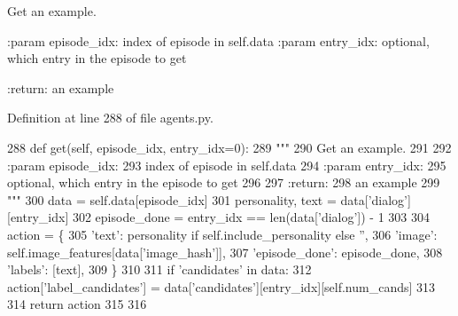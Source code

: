 \begin{DoxyVerb}Get an example.

:param episode_idx:
    index of episode in self.data
:param entry_idx:
    optional, which entry in the episode to get

:return:
    an example
\end{DoxyVerb}
 

Definition at line 288 of file agents.\+py.


\begin{DoxyCode}
288     \textcolor{keyword}{def }get(self, episode\_idx, entry\_idx=0):
289         \textcolor{stringliteral}{"""}
290 \textcolor{stringliteral}{        Get an example.}
291 \textcolor{stringliteral}{}
292 \textcolor{stringliteral}{        :param episode\_idx:}
293 \textcolor{stringliteral}{            index of episode in self.data}
294 \textcolor{stringliteral}{        :param entry\_idx:}
295 \textcolor{stringliteral}{            optional, which entry in the episode to get}
296 \textcolor{stringliteral}{}
297 \textcolor{stringliteral}{        :return:}
298 \textcolor{stringliteral}{            an example}
299 \textcolor{stringliteral}{        """}
300         data = self.data[episode\_idx]
301         personality, text = data[\textcolor{stringliteral}{'dialog'}][entry\_idx]
302         episode\_done = entry\_idx == len(data[\textcolor{stringliteral}{'dialog'}]) - 1
303 
304         action = \{
305             \textcolor{stringliteral}{'text'}: personality \textcolor{keywordflow}{if} self.include\_personality \textcolor{keywordflow}{else} \textcolor{stringliteral}{''},
306             \textcolor{stringliteral}{'image'}: self.image\_features[data[\textcolor{stringliteral}{'image\_hash'}]],
307             \textcolor{stringliteral}{'episode\_done'}: episode\_done,
308             \textcolor{stringliteral}{'labels'}: [text],
309         \}
310 
311         \textcolor{keywordflow}{if} \textcolor{stringliteral}{'candidates'} \textcolor{keywordflow}{in} data:
312             action[\textcolor{stringliteral}{'label\_candidates'}] = data[\textcolor{stringliteral}{'candidates'}][entry\_idx][self.num\_cands]
313 
314         \textcolor{keywordflow}{return} action
315 
316 
\end{DoxyCode}
\mbox{\label{classparlai_1_1tasks_1_1image__chat_1_1agents_1_1ImageChatTestTeacher_a538e34213530b244b4cc4e8c90de7af2}} 
